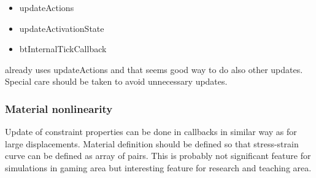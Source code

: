\begin{itemize}
\item updateActions
\item updateActivationState
\item btInternalTickCallback
\end{itemize}

\demolisher already uses updateActions and that seems 
good way to do also other updates. Special care should be taken to avoid unnecessary updates.


\subsubsection{Material nonlinearity}
Update of constraint properties can be done in callbacks in similar way as for large displacements.
Material definition should be defined so that stress-strain curve can be defined as array of pairs.
This is probably not significant feature for simulations in gaming area but interesting feature for research and teaching area.

\cleardoublepage
